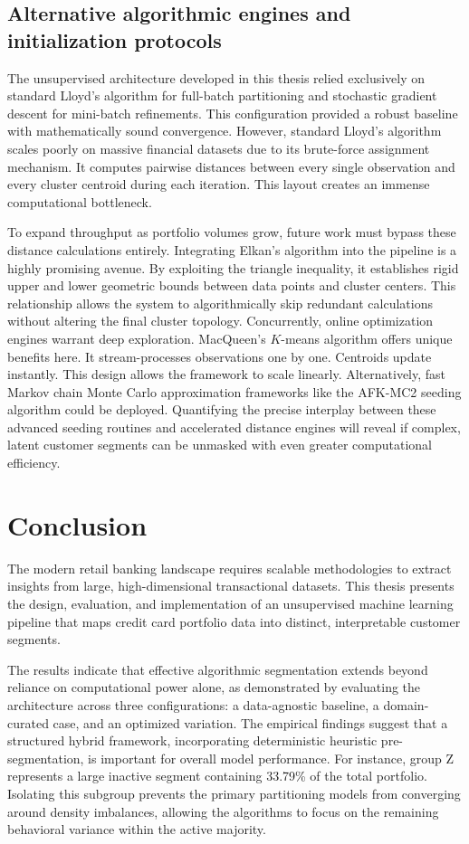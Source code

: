 \section{Alternative algorithmic engines and initialization protocols}
The unsupervised architecture developed in this thesis relied exclusively on standard Lloyd's algorithm for full-batch partitioning and stochastic gradient descent for mini-batch refinements.
This configuration provided a robust baseline with mathematically sound convergence.
However, standard Lloyd's algorithm scales poorly on massive financial datasets due to its brute-force assignment mechanism.
It computes pairwise distances between every single observation and every cluster centroid during each iteration.
This layout creates an immense computational bottleneck.

To expand throughput as portfolio volumes grow, future work must bypass these distance calculations entirely.
Integrating Elkan's algorithm into the pipeline is a highly promising avenue.
By exploiting the triangle inequality, it establishes rigid upper and lower geometric bounds between data points and cluster centers.
This relationship allows the system to algorithmically skip redundant calculations without altering the final cluster topology.
Concurrently, online optimization engines warrant deep exploration. MacQueen’s $K$-means algorithm offers unique benefits here. It stream-processes observations one by one.
Centroids update instantly. This design allows the framework to scale linearly.
Alternatively, fast Markov chain Monte Carlo approximation frameworks like the AFK-MC2 seeding algorithm could be deployed.
Quantifying the precise interplay between these advanced seeding routines and accelerated distance engines will reveal if complex, latent customer segments can be unmasked with even greater computational efficiency.
\newEmptyPage

\chapter{Conclusion}
\label{chap:Conclusion}

The modern retail banking landscape requires scalable methodologies to extract insights from large, high-dimensional transactional datasets. This thesis presents the design, evaluation, and implementation of an unsupervised machine learning pipeline that maps credit card portfolio data into distinct, interpretable customer segments. 

The results indicate that effective algorithmic segmentation extends beyond reliance on computational power alone, as demonstrated by evaluating the architecture across three configurations: a data-agnostic baseline, a domain-curated case, and an optimized variation. The empirical findings suggest that a structured hybrid framework, incorporating deterministic heuristic pre-segmentation, is important for overall model performance. For instance, group Z represents a large inactive segment containing 33.79\% of the total portfolio. Isolating this subgroup prevents the primary partitioning models from converging around density imbalances, allowing the algorithms to focus on the remaining behavioral variance within the active majority.

